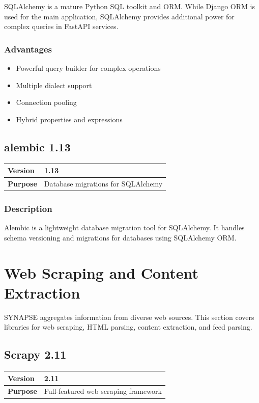 \documentclass[12pt,a4paper]{report}
\begin{document}
SQLAlchemy is a mature Python SQL toolkit and ORM. While Django ORM is used for the main application, SQLAlchemy provides additional power for complex queries in FastAPI services.

\subsection{Advantages}

\begin{itemize}
    \item Powerful query builder for complex operations
    \item Multiple dialect support
    \item Connection pooling
    \item Hybrid properties and expressions
\end{itemize}

\section{alembic 1.13}

\begin{tabular}{|p{4cm}|p{10cm}|}
\hline
\textbf{Version} & 1.13 \\
\hline
\textbf{Purpose} & Database migrations for SQLAlchemy \\
\hline
\end{tabular}

\subsection{Description}

Alembic is a lightweight database migration tool for SQLAlchemy. It handles schema versioning and migrations for databases using SQLAlchemy ORM.

\chapter{Web Scraping and Content Extraction}

SYNAPSE aggregates information from diverse web sources. This section covers libraries for web scraping, HTML parsing, content extraction, and feed parsing.

\section{Scrapy 2.11}

\begin{tabular}{|p{4cm}|p{10cm}|}
\hline
\textbf{Version} & 2.11 \\
\hline
\textbf{Purpose} & Full-featured web scraping framework \\
\hline
\end{tabular}
\end{document}
